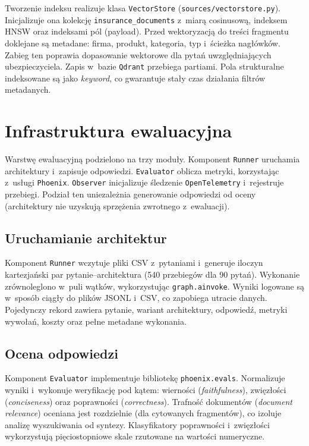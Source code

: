Tworzenie indeksu realizuje klasa \texttt{VectorStore}
(\texttt{sources/vectorstore.py}). Inicjalizuje ona kolekcję
\texttt{insurance\_documents} z~miarą cosinusową, indeksem HNSW oraz indeksami
pól (payload). Przed wektoryzacją do treści fragmentu doklejane są metadane:
firma, produkt, kategoria, typ i~ścieżka nagłówków. Zabieg ten poprawia
dopasowanie wektorowe dla pytań uwzględniających ubezpieczyciela. Zapis w~bazie
\texttt{Qdrant} przebiega partiami. Pola strukturalne indeksowane są jako
\textit{keyword}, co gwarantuje stały czas działania filtrów metadanych.

\section{Infrastruktura ewaluacyjna}\label{sec:infrastruktura-ewaluacyjna}

Warstwę ewaluacyjną podzielono na trzy moduły. Komponent \texttt{Runner}
uruchamia architektury i~zapisuje odpowiedzi. \texttt{Evaluator} oblicza
metryki, korzystając z~usługi \texttt{Phoenix}. \texttt{Observer} inicjalizuje
śledzenie \texttt{OpenTelemetry} i~rejestruje przebiegi. Podział ten
uniezależnia generowanie odpowiedzi od oceny (architektury nie uzyskują
sprzężenia zwrotnego z~ewaluacji).

\subsection{Uruchamianie architektur}\label{subsec:uruchamianie-architektur}

Komponent \texttt{Runner} wczytuje pliki CSV z~pytaniami i~generuje iloczyn
kartezjański par pytanie--architektura (540 przebiegów dla 90 pytań). Wykonanie
zrównoleglono w~puli wątków, wykorzystując \texttt{graph.ainvoke}. Wyniki
logowane są w~sposób ciągły do plików JSONL i~CSV, co zapobiega utracie danych.
Pojedynczy rekord zawiera pytanie, wariant architektury, odpowiedź, metryki
wywołań, koszty oraz pełne metadane wykonania.

\subsection{Ocena odpowiedzi}\label{subsec:ocena-odpowiedzi}

Komponent \texttt{Evaluator} implementuje bibliotekę \texttt{phoenix.evals}.
Normalizuje wyniki i~wykonuje weryfikację pod kątem: wierności
(\textit{faithfulness}), zwięzłości (\textit{conciseness}) oraz poprawności
(\textit{correctness}). Trafność dokumentów (\textit{document relevance})
oceniana jest rozdzielnie (dla cytowanych fragmentów), co izoluje analizę
wyszukiwania od syntezy. Klasyfikatory poprawności i~zwięzłości wykorzystują
pięciostopniowe skale rzutowane na wartości numeryczne.

